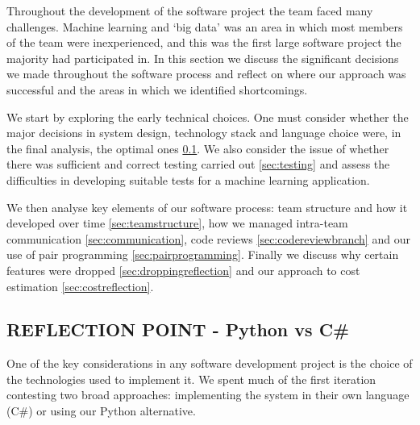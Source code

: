 \documentclass{l3proj}
\begin{document}


Throughout the development of the software project the team faced many challenges. Machine learning and ‘big data’ was an area in which most members of the team were inexperienced, and this was the first large software project the majority had participated in. In this section we discuss the significant decisions we made throughout the software process and reflect on where our approach was successful and the areas in which we identified shortcomings. 

We start by exploring the early technical choices. One must consider whether the major decisions in system design, technology stack and language choice were, in the final analysis, the optimal ones \ref{sec:pyreflection}. We also consider the issue of whether there was sufficient and correct testing carried out \ref{sec:testing} and assess the difficulties in developing suitable tests for a machine learning application.

We then analyse key elements of our software process: team structure and how it developed over time \ref{sec:teamstructure}, how we managed intra-team communication  \ref{sec:communication}, code reviews \ref{sec:codereviewbranch} and our use of pair programming \ref{sec:pairprogramming}. Finally we discuss why certain features were dropped \ref{sec:droppingreflection} and our approach to cost estimation \ref{sec:costreflection}.


\subsection{REFLECTION POINT - Python vs C\#}
\label{sec:pyreflection}



One of the key considerations in any software development project is the choice of the technologies used to implement it. We spent much of the first iteration contesting two broad approaches: implementing the system in their own language (C\#) or using our Python alternative.
\end{document}
